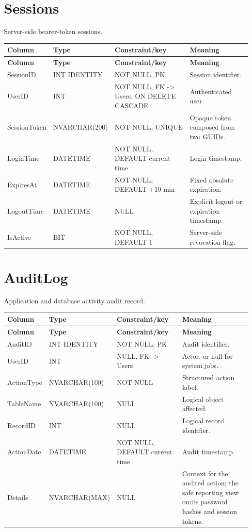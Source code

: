 \documentclass[11pt,a4paper,oneside]{report}
\begin{document}
\section{Sessions}
Server-side bearer-token sessions.
\begin{longtable}{L{0.21\textwidth}L{0.18\textwidth}L{0.24\textwidth}L{0.31\textwidth}}
\toprule
\textbf{Column} & \textbf{Type} & \textbf{Constraint/key} & \textbf{Meaning}\\
\midrule\endfirsthead
\toprule\textbf{Column} & \textbf{Type} & \textbf{Constraint/key} & \textbf{Meaning}\\\midrule\endhead
SessionID & INT IDENTITY & NOT NULL, PK & Session identifier.\\
UserID & INT & NOT NULL, FK -> Users, ON DELETE CASCADE & Authenticated user.\\
SessionToken & NVARCHAR(200) & NOT NULL, UNIQUE & Opaque token composed from two GUIDs.\\
LoginTime & DATETIME & NOT NULL, DEFAULT current time & Login timestamp.\\
ExpiresAt & DATETIME & NOT NULL, DEFAULT +10 min & Fixed absolute expiration.\\
LogoutTime & DATETIME & NULL & Explicit logout or expiration timestamp.\\
IsActive & BIT & NOT NULL, DEFAULT 1 & Server-side revocation flag.\\
\bottomrule
\end{longtable}

\section{AuditLog}
Application and database activity audit record.
\begin{longtable}{L{0.21\textwidth}L{0.18\textwidth}L{0.24\textwidth}L{0.31\textwidth}}
\toprule
\textbf{Column} & \textbf{Type} & \textbf{Constraint/key} & \textbf{Meaning}\\
\midrule\endfirsthead
\toprule\textbf{Column} & \textbf{Type} & \textbf{Constraint/key} & \textbf{Meaning}\\\midrule\endhead
AuditID & INT IDENTITY & NOT NULL, PK & Audit identifier.\\
UserID & INT & NULL, FK -> Users & Actor, or null for system jobs.\\
ActionType & NVARCHAR(100) & NOT NULL & Structured action label.\\
TableName & NVARCHAR(100) & NULL & Logical object affected.\\
RecordID & INT & NULL & Logical record identifier.\\
ActionDate & DATETIME & NOT NULL, DEFAULT current time & Audit timestamp.\\
Details & NVARCHAR(MAX) & NULL & Context for the audited action; the safe reporting view omits password hashes and session tokens.\\
\bottomrule
\end{longtable}
\end{document}
